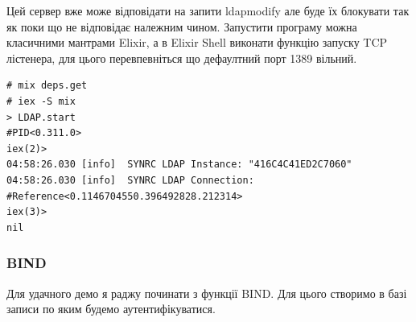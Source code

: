Цей сервер вже може відповідати на запити ldapmodify але буде їх блокувати так як поки що не відповідає належним чином. Запустити програму можна класичними мантрами Elixir, а в Elixir Shell виконати функцію запуску TCP лістенера, для цього перевпевніться що дефаултний порт 1389 вільний.

\begin{lstlisting}
# mix deps.get
# iex -S mix
> LDAP.start
#PID<0.311.0>
iex(2)>
04:58:26.030 [info]  SYNRC LDAP Instance: "416C4C41ED2C7060"
04:58:26.030 [info]  SYNRC LDAP Connection: #Reference<0.1146704550.396492828.212314>
iex(3)>
nil
\end{lstlisting}

\newpage
\subsubsection{BIND}

Для удачного демо я раджу починати з функції BIND. Для цього створимо в базі записи по яким будемо аутентифікуватися.

